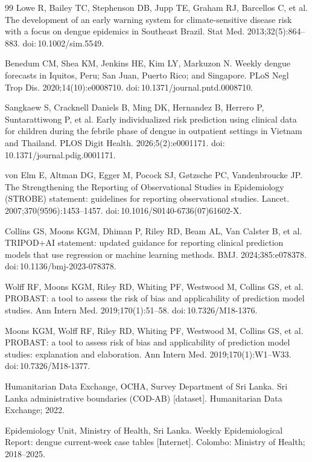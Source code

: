 \documentclass[11pt,a4paper]{article}
\begin{document}
\begin{thebibliography}{99}
 Lowe R, Bailey TC, Stephenson DB, Jupp TE, Graham RJ, Barcellos C, et al. The development of an early warning system for climate-sensitive disease risk with a focus on dengue epidemics in Southeast Brazil. Stat Med. 2013;32(5):864--883. doi:\,10.1002/sim.5549.

 Benedum CM, Shea KM, Jenkins HE, Kim LY, Markuzon N. Weekly dengue forecasts in Iquitos, Peru; San Juan, Puerto Rico; and Singapore. PLoS Negl Trop Dis. 2020;14(10):e0008710. doi:\,10.1371/journal.pntd.0008710.

 Sangkaew S, Cracknell Daniels B, Ming DK, Hernandez B, Herrero P, Suntarattiwong P, et al. Early individualized risk prediction using clinical data for children during the febrile phase of dengue in outpatient settings in Vietnam and Thailand. PLOS Digit Health. 2026;5(2):e0001171. doi:\,10.1371/journal.pdig.0001171.

 von Elm E, Altman DG, Egger M, Pocock SJ, G\o tzsche PC, Vandenbroucke JP. The Strengthening the Reporting of Observational Studies in Epidemiology (STROBE) statement: guidelines for reporting observational studies. Lancet. 2007;370(9596):1453--1457. doi:\,10.1016/S0140-6736(07)61602-X.

 Collins GS, Moons KGM, Dhiman P, Riley RD, Beam AL, Van Calster B, et al. TRIPOD+AI statement: updated guidance for reporting clinical prediction models that use regression or machine learning methods. BMJ. 2024;385:e078378. doi:\,10.1136/bmj-2023-078378.

 Wolff RF, Moons KGM, Riley RD, Whiting PF, Westwood M, Collins GS, et al. PROBAST: a tool to assess the risk of bias and applicability of prediction model studies. Ann Intern Med. 2019;170(1):51--58. doi:\,10.7326/M18-1376.

 Moons KGM, Wolff RF, Riley RD, Whiting PF, Westwood M, Collins GS, et al. PROBAST: a tool to assess risk of bias and applicability of prediction model studies: explanation and elaboration. Ann Intern Med. 2019;170(1):W1--W33. doi:\,10.7326/M18-1377.

 Humanitarian Data Exchange, OCHA, Survey Department of Sri Lanka. Sri Lanka administrative boundaries (COD-AB) [dataset]. Humanitarian Data Exchange; 2022.

 Epidemiology Unit, Ministry of Health, Sri Lanka. Weekly Epidemiological Report: dengue current-week case tables [Internet]. Colombo: Ministry of Health; 2018--2025.


\end{thebibliography}
\end{document}
